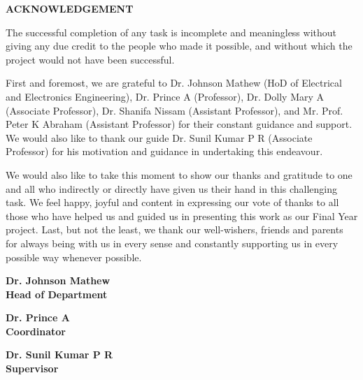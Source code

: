 \begin{center}
\Large \textbf{ACKNOWLEDGEMENT}\\
\end{center}
\vspace{0.5cm}
     
The successful completion of any task is incomplete and meaningless without giving any due credit to the people who made it possible, and without which the project would not have been successful.
     
First and foremost, we are grateful to Dr. Johnson Mathew (HoD of Electrical and Electronics Engineering), Dr. Prince A (Professor), Dr. Dolly Mary A (Associate Professor), Dr. Shanifa Nissam (Assistant Professor), and Mr. Prof. Peter K Abraham (Assistant Professor) for their constant guidance and support. We would also like to thank our guide Dr. Sunil Kumar P R (Associate Professor) for his motivation and guidance in undertaking this endeavour.
     
We would also like to take this moment to show our thanks and gratitude to one and all who indirectly or directly have given us their hand in this challenging task. We feel happy, joyful and content in expressing our vote of thanks to all those who have helped us and guided us in presenting this work as our Final Year project. Last, but not the least, we thank our well-wishers, friends and parents for always being with us in every sense and constantly supporting us in every possible way whenever possible.

\vspace{2 cm}

\begin{multicols}{3}
\centering

\textbf{Dr. Johnson Mathew}\\
\textbf{Head of Department}\\
\vspace{0.3cm}

\textbf{Dr. Prince A}\\
\textbf{Coordinator}\\
\vspace{0.3cm}

\textbf{Dr. Sunil Kumar P R}\\
\textbf{Supervisor}\\
\vspace{0.3cm}

\end{multicols}
